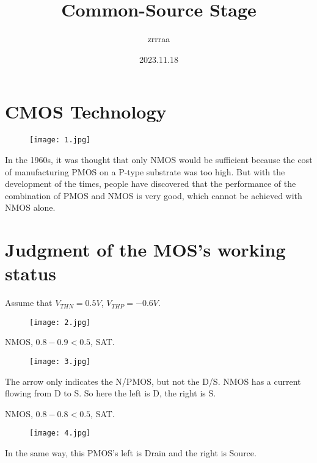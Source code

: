 \documentclass[fontset=windows]{article}
\title{\heiti\zihao{2} Common-Source Stage \uppercase\expandafter{\romannumeral1}}
\author{\songti zrrraa}
\date{2023.11.18}
\begin{document}
\maketitle
\thispagestyle{empty}

\section*{CMOS Technology}

\begin{figure}[htbp]
    \centering
    \texttt{[image: 1.jpg]}
    \captionsetup{labelformat=empty}
    \caption{}
    \label{1}
\end{figure}

In the 1960s, it was thought that only NMOS would be sufficient because the cost of manufacturing PMOS on a P-type substrate was too high. 
But with the development of the times, people have discovered that the performance of the combination of PMOS and NMOS is very good, 
which cannot be achieved with NMOS alone.

\section*{Judgment of the MOS's working status}

Assume that $V_{THN}=0.5V$, $V_{THP}=-0.6V$. 

\begin{figure}[htbp]
    \centering
    \texttt{[image: 2.jpg]}
    \captionsetup{labelformat=empty}
    \caption{}
    \label{2}
\end{figure}

NMOS, $0.8-0.9<0.5$, SAT. 

\begin{figure}[htbp]
    \centering
    \texttt{[image: 3.jpg]}
    \captionsetup{labelformat=empty}
    \caption{}
    \label{3}
\end{figure}

The arrow only indicates the N/PMOS, but not the D/S. 
NMOS has a current flowing from D to S. So here the left is D, the right is S. 

NMOS, $0.8-0.8<0.5$, SAT. 

\begin{figure}[htbp]
    \centering
    \texttt{[image: 4.jpg]}
    \captionsetup{labelformat=empty}
    \caption{}
    \label{4}
\end{figure}

In the same way, this PMOS's left is Drain and the right is Source. 
\end{document}
